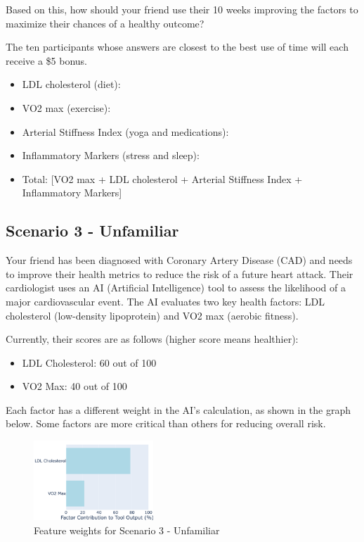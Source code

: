 Based on this, how should your friend use their 10 weeks improving the factors to maximize their chances of a healthy outcome?

The ten participants whose answers are closest to the best use of time will each receive a \$5 bonus. 

\begin{itemize}
    \item LDL cholesterol (diet): \underline{\hspace{2cm}}
    \item VO2 max (exercise): \underline{\hspace{2cm}}
    \item Arterial Stiffness Index (yoga and medications): \underline{\hspace{2cm}}
    \item Inflammatory Markers (stress and sleep): \underline{\hspace{2cm}}
    \item Total: [VO2 max + LDL cholesterol + Arterial Stiffness Index + Inflammatory Markers]
\end{itemize}

\subsection{Scenario 3 - Unfamiliar}
Your friend has been diagnosed with Coronary Artery Disease (CAD) and needs to improve their health metrics to reduce the risk of a future heart attack. Their cardiologist uses an AI (Artificial Intelligence) tool to assess the likelihood of a major cardiovascular event. The AI evaluates two key health factors: LDL cholesterol (low-density lipoprotein) and VO2 max (aerobic fitness).

Currently, their scores are as follows (higher score means healthier):
\begin{itemize}
    \item LDL Cholesterol: 60 out of 100
    \item VO2 Max: 40 out of 100
\end{itemize}

Each factor has a different weight in the AI’s calculation, as shown in the graph below. Some factors are more critical than others for reducing overall risk.
\begin{figure}[ht]
    \centering
    \includegraphics[width=0.4\textwidth]{Figures/2_unf_unbal.png}
    \caption{Feature weights for Scenario 3 - Unfamiliar}
    \label{fig:survey-weights-scenario3-unf}
\end{figure}

